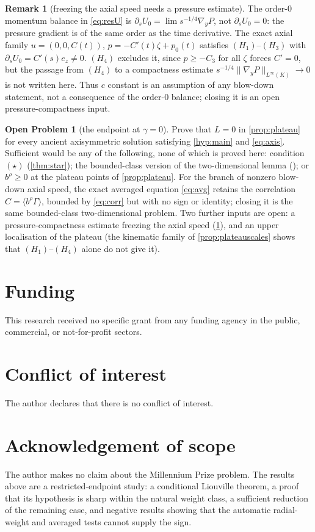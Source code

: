 \documentclass[11pt]{article}
\theoremstyle{definition}
\newtheorem{remark}[theorem]{Remark}
\newtheorem{openproblem}[theorem]{Open Problem}
\newcommand{\grad}{\nabla}
\begin{document}
\begin{remark}[freezing the axial speed needs a pressure estimate]
\label{rem:pressure}
The order-$0$ momentum balance in \eqref{eq:resU} is
$\partial_sU_0=\lim s^{-1/4}\grad_yP$, not $\partial_sU_0=0$: the pressure
gradient is of the same order as the time derivative. The exact axial family
$u=(0,0,C(t))$, $p=-C'(t)\zeta+p_0(t)$ satisfies $(H_1)$--$(H_3)$ with
$\partial_sU_0=C'(s)e_z\ne0$. $(H_4)$ excludes it, since $p\ge-C_3$ for all
$\zeta$ forces $C'=0$, but the passage from $(H_4)$ to a compactness estimate
$s^{-1/4}\|\grad_yP\|_{L^\infty(K)}\to0$ is not written here. Thus $c$
constant is an assumption of any blow-down statement, not a consequence of
the order-$0$ balance; closing it is an open pressure-compactness input.
\end{remark}

\begin{openproblem}[the endpoint at $\gamma=0$]
Prove that $L=0$ in \cref{prop:plateau} for every ancient axisymmetric
solution satisfying \cref{hyp:main} and \eqref{eq:axis}. Sufficient would be
any of the following, none of which is proved here: condition $(\star)$
(\cref{thm:star}); the bounded-class version of the two-dimensional lemma
(\cite{companion}); or $b^\rho\ge0$ at the plateau points of
\cref{prop:plateau}. For the branch of nonzero blow-down axial speed, the
exact averaged equation \eqref{eq:avg} retains the correlation
$C=\langle b^\rho\Gamma\rangle$, bounded by \eqref{eq:corr} but with no sign
or identity; closing it is the same bounded-class two-dimensional problem.
Two further inputs are open: a pressure-compactness estimate freezing the
axial speed (\cref{rem:pressure}), and an upper localisation of the plateau
(the kinematic family of \cref{prop:plateauscales} shows that
$(H_1)$--$(H_4)$ alone do not give it).
\end{openproblem}

\section*{Funding}
This research received no specific grant from any funding agency in the
public, commercial, or not-for-profit sectors.

\section*{Conflict of interest}
The author declares that there is no conflict of interest.

\section*{Acknowledgement of scope}
The author makes no claim about the Millennium Prize problem. The results
above are a restricted-endpoint study: a conditional Liouville theorem, a
proof that its hypothesis is sharp within the natural weight class, a
sufficient reduction of the remaining case, and negative results showing that the automatic radial-weight and averaged
tests cannot supply the sign.
\end{document}

